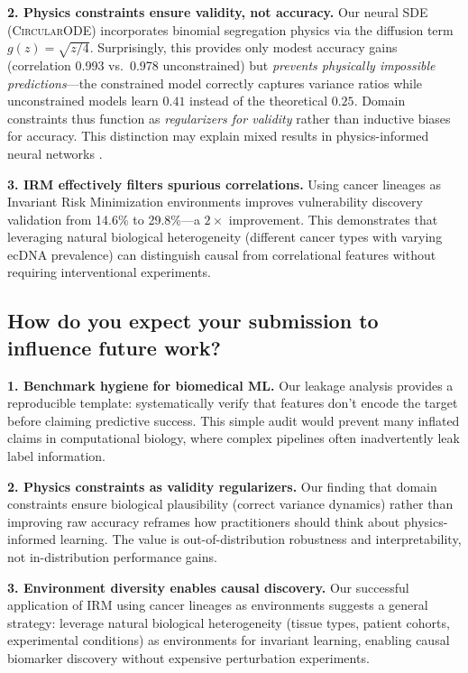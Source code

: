 \documentclass{article}
\newcommand{\circularode}{\textsc{CircularODE}}
\begin{document}
\textbf{2. Physics constraints ensure validity, not accuracy.} Our neural SDE (\circularode{}) incorporates binomial segregation physics via the diffusion term $g(z) = \sqrt{z/4}$. Surprisingly, this provides only modest accuracy gains (correlation 0.993 vs.\ 0.978 unconstrained) but \textit{prevents physically impossible predictions}---the constrained model correctly captures variance ratios while unconstrained models learn $0.41$ instead of the theoretical $0.25$. Domain constraints thus function as \textit{regularizers for validity} rather than inductive biases for accuracy. This distinction may explain mixed results in physics-informed neural networks \citep{raissi_2019_pinn}.

\textbf{3. IRM effectively filters spurious correlations.} Using cancer lineages as Invariant Risk Minimization environments \citep{arjovsky_2019_irm} improves vulnerability discovery validation from 14.6\% to 29.8\%---a $2\times$ improvement. This demonstrates that leveraging natural biological heterogeneity (different cancer types with varying ecDNA prevalence) can distinguish causal from correlational features without requiring interventional experiments.

\subsection*{How do you expect your submission to influence future work?}

\textbf{1. Benchmark hygiene for biomedical ML.} Our leakage analysis provides a reproducible template: systematically verify that features don't encode the target before claiming predictive success. This simple audit would prevent many inflated claims in computational biology, where complex pipelines often inadvertently leak label information.

\textbf{2. Physics constraints as validity regularizers.} Our finding that domain constraints ensure biological plausibility (correct variance dynamics) rather than improving raw accuracy reframes how practitioners should think about physics-informed learning. The value is out-of-distribution robustness and interpretability, not in-distribution performance gains.

\textbf{3. Environment diversity enables causal discovery.} Our successful application of IRM using cancer lineages as environments suggests a general strategy: leverage natural biological heterogeneity (tissue types, patient cohorts, experimental conditions) as environments for invariant learning, enabling causal biomarker discovery without expensive perturbation experiments.
\end{document}
